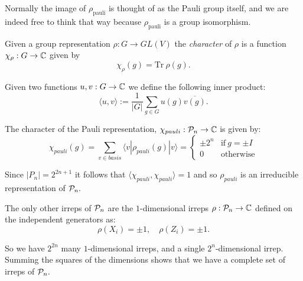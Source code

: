
Normally the image of 
$\rho_{\mathrm{pauli}}$ is thought of as the
Pauli group itself, and we are indeed free to think
that way because $\rho_{\mathrm{pauli}}$ is a group
isomorphism.

Given a group representation $\rho:G\to GL(V)$
the {\it character} of $\rho$ is a function
$\chi_\rho:G\to \mathbb{C}$ given by
$$
    \chi_\rho(g) = \mbox{Tr}\ \rho(g).
$$

Given two functions $u,v : G \to \mathbb{C}$ 
we define the following inner product:
$$
    \langle u, v \rangle := \frac{1}{|G|} \sum_{g\in G} u(g) \overline{v(g)}.
$$

The character of the Pauli representation, $\chi_{{pauli}}:\mathcal{P}_n\to\mathbb{C}$
is given by:
$$
\chi_{{pauli}}(g) = \sum_{v \in basis} \langle v | \rho_{{pauli}}(g) | v \rangle
    = \left\{ \begin{array}{ll}
 \pm 2^n &\mbox{if}\ g=\pm I\\
 0 &\mbox{otherwise}\end{array}\right.
$$

Since $|P_n|=2^{2n+1}$ it follows that
$\langle\chi_{pauli},\chi_{pauli}\rangle = 1$ and
so $\rho_{pauli}$ is an irreducible representation of $\mathcal{P}_n.$

The only other irreps of $\mathcal{P}_n$ are 
the $1$-dimensional irreps $\rho:\mathcal{P}_n\to\mathbb{C}$
defined on the independent generators as:
    $$ \rho(X_i) = \pm 1,\quad \rho(Z_i) = \pm 1.$$

So we have $2^{2n}$ many $1$-dimensional irreps,
and a single $2^n$-dimensional irrep.
Summing the squares of the dimensions
shows that we have a complete set of irreps of $\mathcal{P}_n.$

%



